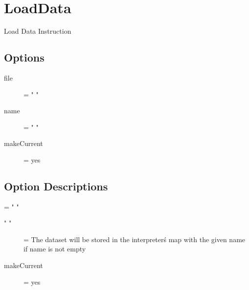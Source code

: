 \section{LoadData}

Load Data Instruction

\subsection{Options}
\begin{description}
\item[file] = " "
\item[name] = " "
\item[makeCurrent] = yes
\end{description}

\subsection{Option Descriptions}
\item[name] = " "
	\begin{description}
	\item[" "] = The dataset will be stored in the interpreter\'s map with the given name if name is not empty
\item[makeCurrent] = yes
\end{description}